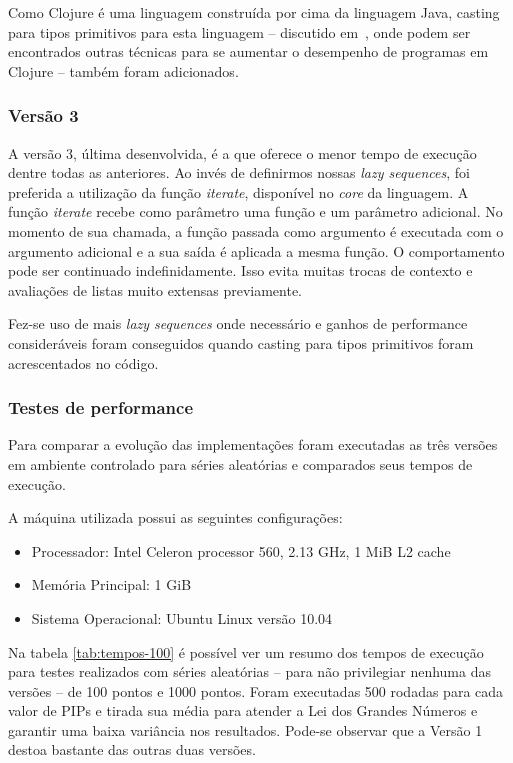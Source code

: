 Como Clojure é uma linguagem construída por cima da linguagem Java, casting para tipos primitivos para esta linguagem -- discutido em~\cite{practicalclojure}, onde podem ser encontrados outras técnicas para se aumentar o desempenho de programas em Clojure -- também foram adicionados.


\subsubsection{Versão 3}
A versão 3, última desenvolvida, é a que oferece o menor tempo de execução dentre todas as anteriores.
Ao invés de definirmos nossas \textit{lazy sequences}, foi preferida a utilização da função \textit{iterate}, disponível no \textit{core} da linguagem. A função \textit{iterate} recebe como parâmetro uma função e um parâmetro adicional. No momento de sua chamada, a função passada como argumento é executada com o argumento adicional e a sua saída é aplicada a mesma função. O comportamento pode ser continuado indefinidamente. Isso evita muitas trocas de contexto e avaliações de listas muito extensas previamente.

Fez-se uso de mais \textit{lazy sequences} onde necessário e ganhos de performance consideráveis foram conseguidos quando casting para tipos primitivos foram acrescentados no código.

\subsubsection{Testes de performance}
Para comparar a evolução das implementações foram executadas as três versões em ambiente controlado para séries aleatórias e comparados seus tempos de execução.

A máquina utilizada possui as seguintes configurações:
\begin{itemize}
\item Processador: Intel Celeron processor 560, 2.13 GHz, 1 MiB L2 cache
\item Memória Principal: 1 GiB
\item Sistema Operacional: Ubuntu Linux versão 10.04
\end{itemize}

Na tabela \ref{tab:tempos-100} é possível ver um resumo dos tempos de execução para testes realizados com séries aleatórias -- para não privilegiar nenhuma das versões -- de 100 pontos e 1000 pontos. Foram executadas 500 rodadas para cada valor de PIPs e tirada sua média para atender a Lei dos Grandes Números e garantir uma baixa variância nos resultados. Pode-se observar que a Versão 1 destoa bastante das outras duas versões.

